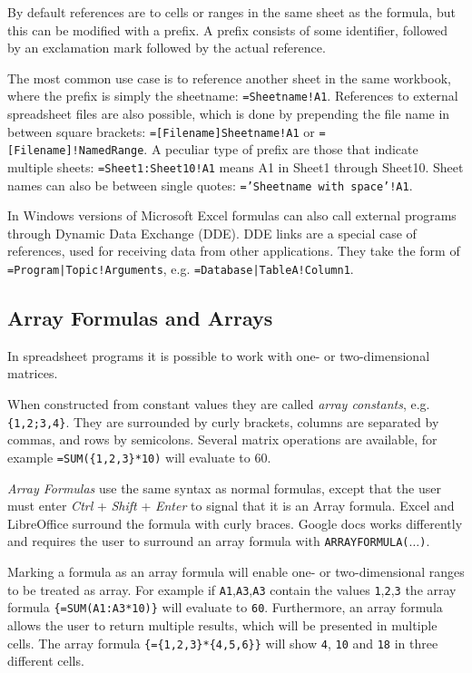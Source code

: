 \documentclass[conference]{IEEEtran}
\begin{document}
By default references are to cells or ranges in the same sheet as the formula, but this can be modified with a prefix. A prefix consists of some identifier, followed by an exclamation mark followed by the actual reference.

The most common use case is to reference another sheet in the same workbook, where the prefix is simply the sheetname: \texttt{=Sheetname!A1}. References to external spreadsheet files are also possible, which is done by prepending the file name in between square brackets: \texttt{=[Filename]Sheetname!A1} or \texttt{=[Filename]!NamedRange}.
A peculiar type of prefix are those that indicate multiple sheets: \texttt{=Sheet1:Sheet10!A1} means A1 in Sheet1 through Sheet10.
Sheet names can also be between single quotes: \texttt{='Sheetname with space'!A1}. 

In Windows versions of Microsoft Excel formulas can also call external programs through Dynamic Data Exchange (DDE). DDE links are a special case of references, used for receiving data from other applications. They take the form of \texttt{=Program|Topic!Arguments}, e.g. \texttt{=Database|TableA!Column1}.

\subsection{Array Formulas and Arrays}
\label{sec:arrayformulas}
In spreadsheet programs it is possible to work with one- or two-dimensional matrices.

When constructed from constant values they are called \emph{array constants}, e.g. \texttt{\{1,2;3,4\}}.
They are surrounded by curly brackets, columns are separated by commas, and rows by semicolons.
Several matrix operations are available, for example \texttt{=SUM(\{1,2,3\}*10)} will evaluate to 60.

\emph{Array Formulas} use the same syntax as normal formulas, except that the user must enter \emph{Ctrl} + \emph{Shift} + \emph{Enter} to signal that it is an Array formula.
Excel and LibreOffice surround the formula with curly braces.
Google docs works differently and requires the user to surround an array formula with \texttt{ARRAYFORMULA($\ldots$)}.

Marking a formula as an array formula will enable one- or two-dimensional ranges to be treated as array.
For example if \texttt{A1},\texttt{A3},\texttt{A3} contain the values \texttt{1},\texttt{2},\texttt{3} the array formula \texttt{\{=SUM(A1:A3*10)\}} will evaluate to \texttt{60}. Furthermore, an array formula allows the user to return multiple results, which will be presented in multiple cells.
The array formula \texttt{\{=\{1,2,3\}*\{4,5,6\}\}} will show \texttt{4}, \texttt{10} and \texttt{18} in three different cells.
\end{document}
